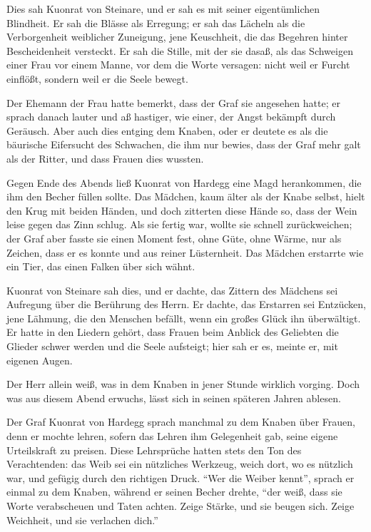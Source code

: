 Dies sah \gls{Kuonrat von Steinare}, und er sah es mit seiner eigentümlichen Blindheit. Er sah die Blässe als Erregung; er sah das Lächeln als die Verborgenheit weiblicher Zuneigung, jene Keuschheit, die das Begehren hinter Bescheidenheit versteckt. Er sah die Stille, mit der sie dasaß, als das Schweigen einer Frau vor einem Manne, vor dem die Worte versagen: nicht weil er Furcht einflößt, sondern weil er die Seele bewegt.

Der Ehemann der Frau hatte bemerkt, dass der Graf sie angesehen hatte; er sprach danach lauter und aß hastiger, wie einer, der Angst bekämpft durch Geräusch. Aber auch dies entging dem Knaben, oder er deutete es als die bäurische Eifersucht des Schwachen, die ihm nur bewies, dass der Graf mehr galt als der Ritter, und dass Frauen dies wussten.

Gegen Ende des Abends ließ \gls{Kuonrat von Hardegg} eine Magd herankommen, die ihm den Becher füllen sollte. Das Mädchen, kaum älter als der Knabe selbst, hielt den Krug mit beiden Händen, und doch zitterten diese Hände so, dass der Wein leise gegen das Zinn schlug. Als sie fertig war, wollte sie schnell zurückweichen; der Graf aber fasste sie einen Moment fest, ohne Güte, ohne Wärme, nur als Zeichen, dass er es konnte und aus reiner Lüsternheit. Das Mädchen erstarrte wie ein Tier, das einen Falken über sich wähnt.

\gls{Kuonrat von Steinare} sah dies, und er dachte, das Zittern des Mädchens sei Aufregung über die Berührung des Herrn. Er dachte, das Erstarren sei Entzücken, jene Lähmung, die den Menschen befällt, wenn ein großes Glück ihn überwältigt. Er hatte in den Liedern gehört, dass Frauen beim Anblick des Geliebten die Glieder schwer werden und die Seele aufsteigt; hier sah er es, meinte er, mit eigenen Augen.

Der Herr allein weiß, was in dem Knaben in jener Stunde wirklich vorging. Doch was aus diesem Abend erwuchs, lässt sich in seinen späteren Jahren ablesen.

Der Graf \gls{Kuonrat von Hardegg} sprach manchmal zu dem Knaben über Frauen, denn er mochte lehren, sofern das Lehren ihm Gelegenheit gab, seine eigene Urteilskraft zu preisen. Diese Lehrsprüche hatten stets den Ton des Verachtenden: das Weib sei ein nützliches Werkzeug, weich dort, wo es nützlich war, und gefügig durch den richtigen Druck. \enquote{Wer die Weiber kennt}, sprach er einmal zu dem Knaben, während er seinen Becher drehte, \enquote{der weiß, dass sie Worte verabscheuen und Taten achten. Zeige Stärke, und sie beugen sich. Zeige Weichheit, und sie verlachen dich.}

